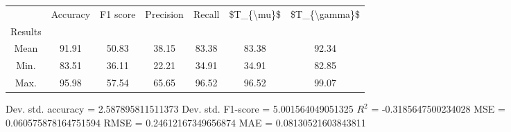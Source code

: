 \begin{tabular}{|c|c|c|c|c|c|c|}
\toprule
{} &  Accuracy &  F1 score &  Precision &  Recall &  \$T\_\{\textbackslash mu\}\$ &  \$T\_\{\textbackslash gamma\}\$ \\
Results &           &           &            &         &            &               \\
\hline
Mean    &     91.91 &     50.83 &      38.15 &   83.38 &      83.38 &         92.34 \\
Min.    &     83.51 &     36.11 &      22.21 &   34.91 &      34.91 &         82.85 \\
Max.    &     95.98 &     57.54 &      65.65 &   96.52 &      96.52 &         99.07 \\
\bottomrule
\end{tabular}

 Dev. std. accuracy = 2.587895811511373
 Dev. std. F1-score = 5.001564049051325
 $R^2$ = -0.3185647500234028
 MSE = 0.060575878164751594
 RMSE = 0.24612167349656874
 MAE = 0.08130521603843811
